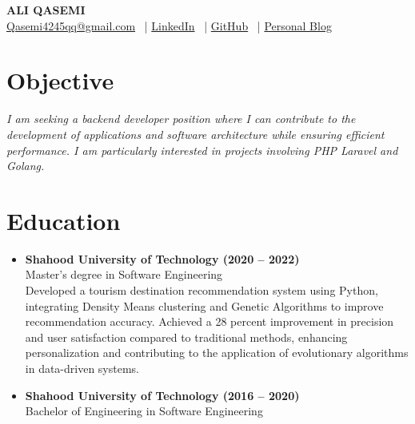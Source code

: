 \documentclass[10pt, letterpaper]{article}
\newcommand{\icon}[1]{{\small #1}}
\begin{document}
\begin{center}
    \fontsize{30pt}{30pt}\textbf{ALI QASEMI} \\
    \vspace{0.2cm}
    \href{mailto:Qasemi4245qq@gmail.com}{\icon{\faEnvelope[regular]} Qasemi4245qq@gmail.com} \ |
    \href{https://www.linkedin.com/in/aliqasemi/}{\icon{\faLinkedin} LinkedIn} \ |
    \href{https://github.com/aliqasemi}{\icon{\faGithub} GitHub} \ |
    \href{http://aliqasemi.github.io/}{\icon{\faLink} Personal Blog}
\end{center}

\section{Objective}
\textit{I am seeking a backend developer position where I can contribute to the development of applications and software architecture while ensuring efficient performance. I am particularly interested in projects involving PHP Laravel and Golang.}

\section{Education}
\begin{itemize}[leftmargin=*]
    \item \textbf{Shahood University of Technology (2020 -- 2022)} \\
    Master's degree in Software Engineering \\
    Developed a tourism destination recommendation system using Python, integrating Density Means clustering and Genetic Algorithms to improve recommendation accuracy. Achieved a 28 percent improvement in precision and user satisfaction compared to traditional methods, enhancing personalization and contributing to the application of evolutionary algorithms in data-driven systems.
    \item \textbf{Shahood University of Technology (2016 -- 2020)} \\
    Bachelor of Engineering in Software Engineering
\end{itemize}


\end{document}
